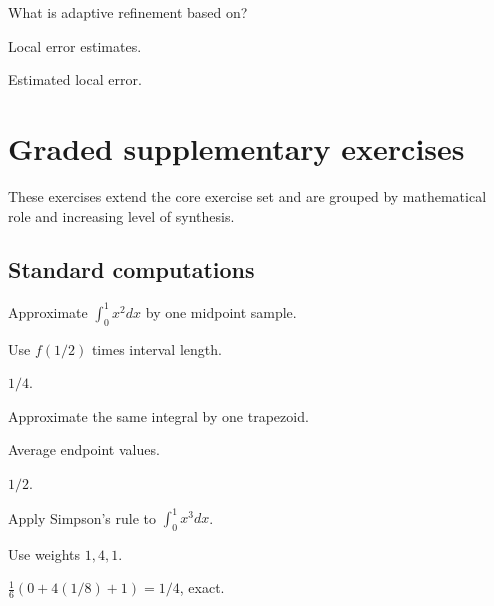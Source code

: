 \begin{exercise}\label{exr:ii24-08}
What is adaptive refinement based on?
\end{exercise}
\begin{hint}
Local error estimates.
\end{hint}
\begin{solution}
Estimated local error.
\end{solution}


\section{Graded supplementary exercises}
These exercises extend the core exercise set and are grouped by mathematical role and increasing level of synthesis.

\subsection*{Standard computations}

\begin{exercise}[Midpoint]\label{exr:ii24-expand-01}
Approximate \(\int_0^1x^2dx\) by one midpoint sample.
\end{exercise}
\begin{hint}
Use \(f(1/2)\) times interval length.
\end{hint}
\begin{solution}
\(1/4\).
\end{solution}

\begin{exercise}[Trapezoid]\label{exr:ii24-expand-02}
Approximate the same integral by one trapezoid.
\end{exercise}
\begin{hint}
Average endpoint values.
\end{hint}
\begin{solution}
\(1/2\).
\end{solution}

\begin{exercise}[Simpson]\label{exr:ii24-expand-03}
Apply Simpson's rule to \(\int_0^1x^3dx\).
\end{exercise}
\begin{hint}
Use weights \(1,4,1\).
\end{hint}
\begin{solution}
\(\frac16(0+4(1/8)+1)=1/4\), exact.
\end{solution}

